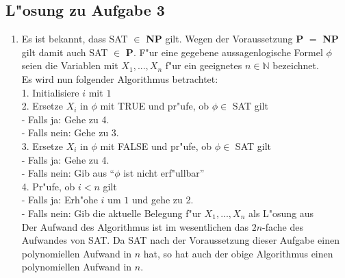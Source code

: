 \documentclass[10pt,oneside,onecolumn,a4paper,german,titlepage]{article}
\begin{document}
\subsection*{L"osung zu Aufgabe 3}
\begin{enumerate}
\item Es ist bekannt, dass SAT $\in$ \textbf{NP} gilt. Wegen der Voraussetzung
\textbf{P} $=$ \textbf{NP} gilt damit auch SAT $\in$ \textbf{P}. F"ur eine gegebene
aussagenlogische Formel $\phi$ seien die Variablen mit $X_1,...,X_n$ f"ur ein
geeignetes $n \in \mathbb{N}$ bezeichnet.\\
Es wird nun folgender Algorithmus betrachtet:\\[4pt]
1. Initialisiere $i$ mit $1$\\
2. Ersetze $X_i$ in $\phi$ mit TRUE und pr"ufe, ob $\phi \in$ SAT gilt\\
- Falls ja: Gehe zu 4.\\
- Falls nein: Gehe zu 3.\\
3. Ersetze $X_i$ in $\phi$ mit FALSE und pr"ufe, ob $\phi \in$ SAT gilt\\
- Falls ja: Gehe zu 4.\\
- Falls nein: Gib aus ``$\phi$ ist nicht erf"ullbar''\\
4. Pr"ufe, ob $i < n$ gilt\\
- Falls ja: Erh"ohe $i$ um $1$ und gehe zu 2.\\
- Falls nein: Gib die aktuelle Belegung f"ur $X_1,...,X_n$ als L"osung aus\\[4pt]
Der Aufwand des Algorithmus ist im wesentlichen das $2n$-fache des Aufwandes von SAT.
Da SAT nach der Voraussetzung dieser Aufgabe einen polynomiellen Aufwand in $n$ hat,
so hat auch der obige Algorithmus einen polynomiellen Aufwand in $n$.
\end{enumerate}
\end{document}

